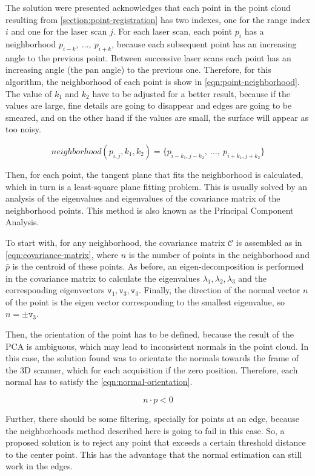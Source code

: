 The solution were presented acknowledges that each point in the point cloud resulting from \cref{section:point-registration} has two indexes, one for the range index $i$ and one for the laser scan $j$. For each laser scan, each point $p_i$ has a neighborhood ${p_{i-k}, \ \dots, \ p_{i+k}}$, because each subsequent point has an increasing angle to the previous point. Between successive laser scans each point has an increasing angle (the pan angle) to the previous one. Therefore, for this algorithm, the neighborhood of each point is show in \cref{eqn:point-neighborhood}. The value of $k_1$ and $k_2$ have to be adjusted for a better result, because if the values are large, fine details are going to disappear and edges are going to be smeared, and on the other hand if the values are small, the surface will appear as too noisy.

\begin{equation}
\label{eqn:point-neighborhood}
    neighborhood(p_{i,j}, k_1, k_2) = \{p_{i-k_1, j-k_2}, \ \dots, \ p_{i+k_1, j+k_2}\}
\end{equation}

Then, for each point, the tangent plane that fits the neighborhood is calculated, which in turn is a least-square plane fitting problem. This is usually solved by an analysis of the eigenvalues and eigenvalues of the covariance matrix of the neighborhood points. This method is also known as the Principal Component Analysis.

To start with, for any neighborhood, the covariance matrix $\mathcal{C}$ is assembled as in \cref{eqn:covariance-matrix}, where $n$ is the number of points in the neighborhood and $\bar{p}$ is the centroid of these points. As before, an eigen-decomposition is performed in the covariance matrix to calculate the eigenvalues $\lambda_1, \lambda_2, \lambda_3$ and the corresponding eigenvectors $\texttt{v}_1, \texttt{v}_3, \texttt{v}_3$. Finally, the direction of the normal vector $n$ of the point is the eigen vector corresponding to the smallest eigenvalue, so $n = \pm \texttt{v}_3$.

Then, the orientation of the point has to be defined, because the result of the PCA is ambiguous, which may lead to inconsistent normals in the point cloud. In this case, the solution found was to orientate the normals towards the frame of the 3D scanner, which for each acquisition if the zero position.     Therefore, each normal has to satisfy the \cref{eqn:normal-orientation}.

\begin{equation}
\label{eqn:normal-orientation}
    n \cdot p < 0
\end{equation}

Further, there should be some filtering, specially for points at an edge, because the neighborhoods method described here is going to fail in this case. So, a proposed solution is to reject any point that exceeds a certain threshold distance to the center point. This has the advantage that the normal estimation can still work in the edges.